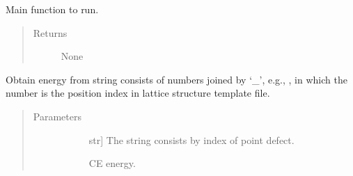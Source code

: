 \documentclass[letterpaper,10pt,english]{sphinxmanual}
\begin{document}
\begin{fulllineitems}
\begin{fulllineitems}
\begin{quote}
\begin{description}
\end{description}\end{quote}

\end{fulllineitems}


\begin{fulllineitems}
\label{\detokenize{pygace:pygace.general_gace.Runner.run}}
\sphinxAtStartPar
Main function to run.
\begin{quote}\begin{description}
\item[{Returns}] \leavevmode\begin{description}
\item[{None}] \leavevmode
\end{description}

\end{description}\end{quote}

\end{fulllineitems}


\begin{fulllineitems}
\label{\detokenize{pygace:pygace.general_gace.Runner.str2energy}}
\sphinxAtStartPar
Obtain energy from string consists of numbers joined by ‘\_’, e.g.,
, in which the number is the position index in lattice
structure template file.
\begin{quote}\begin{description}
\item[{Parameters}] \leavevmode\begin{description}
\item[{}] \leavevmode{[}str{]}
\sphinxAtStartPar
The string consists by index of point defect.

\item[{}] \leavevmode
\item[{}] \leavevmode
\item[{}] \leavevmode
\sphinxAtStartPar
CE energy.

\end{description}

\end{description}\end{quote}

\end{fulllineitems}


\end{fulllineitems}
\end{document}
